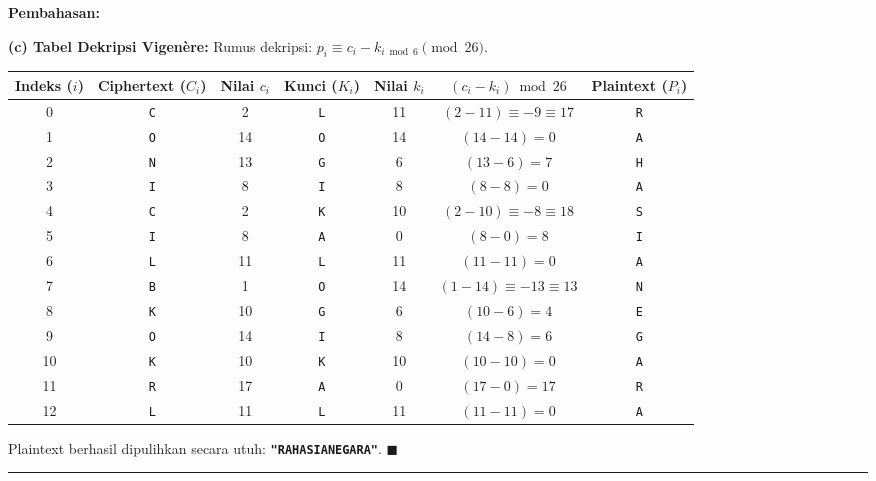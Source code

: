 \documentclass[11pt,a4paper]{article}
\newenvironment{solusi}{\noindent\textbf{\textsf{Pembahasan:}}\par\vspace{0.2em}}{\hfill$\blacksquare$\vspace{1em}\par\hrule\vspace{1em}}
\begin{document}
\begin{solusi}
\vspace{0.2cm}
\textbf{(c) Tabel Dekripsi Vigenère:}
Rumus dekripsi: $p_i \equiv c_i - k_{i \bmod 6} \pmod{26}$.
\begin{center}
\footnotesize
\begin{tabular}{c c c c c c c}
\toprule
\textbf{Indeks ($i$)} & \textbf{Ciphertext ($C_i$)} & \textbf{Nilai $c_i$} & \textbf{Kunci ($K_i$)} & \textbf{Nilai $k_i$} & $(c_i - k_i) \bmod 26$ & \textbf{Plaintext ($P_i$)} \\
\midrule
0  & \texttt{C} & 2  & \texttt{L} & 11 & $(2 - 11) \equiv -9 \equiv 17$ & \texttt{R} \\
1  & \texttt{O} & 14 & \texttt{O} & 14 & $(14 - 14) = 0$                & \texttt{A} \\
2  & \texttt{N} & 13 & \texttt{G} & 6  & $(13 - 6) = 7$                 & \texttt{H} \\
3  & \texttt{I} & 8  & \texttt{I} & 8  & $(8 - 8) = 0$                  & \texttt{A} \\
4  & \texttt{C} & 2  & \texttt{K} & 10 & $(2 - 10) \equiv -8 \equiv 18$ & \texttt{S} \\
5  & \texttt{I} & 8  & \texttt{A} & 0  & $(8 - 0) = 8$                  & \texttt{I} \\
6  & \texttt{L} & 11 & \texttt{L} & 11 & $(11 - 11) = 0$                & \texttt{A} \\
7  & \texttt{B} & 1  & \texttt{O} & 14 & $(1 - 14) \equiv -13 \equiv 13$& \texttt{N} \\
8  & \texttt{K} & 10 & \texttt{G} & 6  & $(10 - 6) = 4$                 & \texttt{E} \\
9  & \texttt{O} & 14 & \texttt{I} & 8  & $(14 - 8) = 6$                 & \texttt{G} \\
10 & \texttt{K} & 10 & \texttt{K} & 10 & $(10 - 10) = 0$                & \texttt{A} \\
11 & \texttt{R} & 17 & \texttt{A} & 0  & $(17 - 0) = 17$                & \texttt{R} \\
12 & \texttt{L} & 11 & \texttt{L} & 11 & $(11 - 11) = 0$                & \texttt{A} \\
\bottomrule
\end{tabular}
\end{center}
Plaintext berhasil dipulihkan secara utuh: \textbf{\texttt{"RAHASIANEGARA"}}.
\end{solusi}

\end{document}
